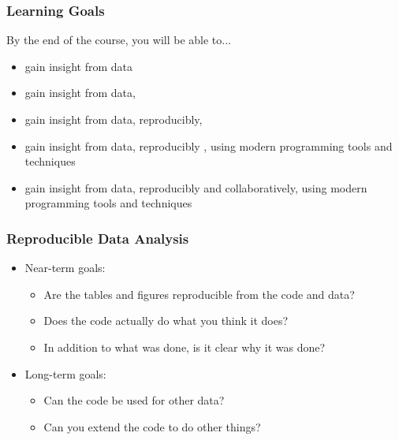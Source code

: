 \documentclass[11pt]{beamer}
\begin{document}
	\begin{frame}
		

		\frametitle{\textbf{Learning Goals}}
		By the end of the course, you will be able to...
		
		\begin{itemize}
			\item gain insight from data
			\item gain insight from data, 
			\item gain insight from data, reproducibly, 
			\item gain insight from data, reproducibly , using modern programming tools and techniques
			\item gain insight from data, reproducibly  and collaboratively, using modern programming tools and techniques
		\end{itemize}
	\end{frame}
	
	
	\begin{frame}
		
		
		\frametitle{\textbf{Reproducible Data Analysis}}
		
		\begin{itemize}
			\item Near-term goals:
			\begin{itemize}
				\item Are the tables and figures reproducible from the code and data?
				\item Does the code actually do what you think it does?
				\item In addition to what was done, is it clear why it was done?
			\end{itemize}
			\item Long-term goals:
			\begin{itemize}
				\item Can the code be used for other data?
				\item Can you extend the code to do other things?
			\end{itemize}
		\end{itemize}
	\end{frame}

\end{document}
